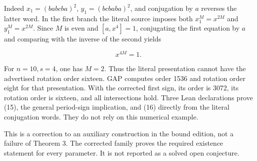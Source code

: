 Indeed \(x_1=(b a b c b a)^2\), \(y_1=(b c b a b a)^2\), and conjugation by \(a\)
reverses the latter word. In the first branch the literal source imposes
both \(x_1^M=x^{2M}\) and \(y_1^M=x^{2M}\). Since \(M\) is even and
\([a,x^4]=1\), conjugating the first equation by \(a\) and comparing with
the inverse of the second yields

\[x^{4M}=1.\tag{16}\]

For \(n=10,s=4\), one has \(M=2\). Thus the literal presentation cannot
have the advertised rotation order sixteen. GAP computes order 1536
and rotation order eight for that presentation. With the corrected
first sign, its order is 3072, its rotation order is sixteen, and all
intersections hold. Three Lean declarations prove (15), the general
period-sign implication, and (16) directly from the literal conjugation
words. They do not rely on this numerical example.

This is a correction to an auxiliary construction in the bound edition,
not a failure of Theorem 3. The corrected family proves the required
existence statement for every parameter. It is not reported as a solved
open conjecture.

